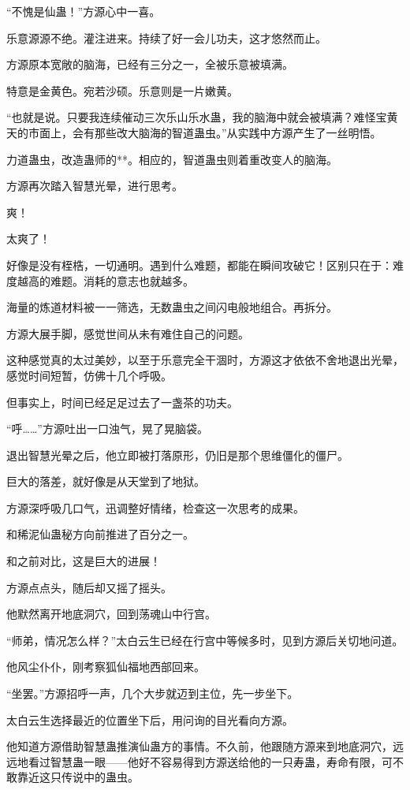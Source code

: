 \begin{this_body}
“不愧是仙蛊！”方源心中一喜。

乐意源源不绝。灌注进来。持续了好一会儿功夫，这才悠然而止。

方源原本宽敞的脑海，已经有三分之一，全被乐意被填满。

特意是金黄色。宛若沙硕。乐意则是一片嫩黄。

“也就是说。只要我连续催动三次乐山乐水蛊，我的脑海中就会被填满？难怪宝黄天的市面上，会有那些改大脑海的智道蛊虫。”从实践中方源产生了一丝明悟。

力道蛊虫，改造蛊师的**。相应的，智道蛊虫则着重改变人的脑海。

方源再次踏入智慧光晕，进行思考。

爽！

太爽了！

好像是没有桎梏，一切通明。遇到什么难题，都能在瞬间攻破它！区别只在于：难度越高的难题。消耗的意志也就越多。

海量的炼道材料被一一筛选，无数蛊虫之间闪电般地组合。再拆分。

方源大展手脚，感觉世间从未有难住自己的问题。

这种感觉真的太过美妙，以至于乐意完全干涸时，方源这才依依不舍地退出光晕，感觉时间短暂，仿佛十几个呼吸。

但事实上，时间已经足足过去了一盏茶的功夫。

“呼……”方源吐出一口浊气，晃了晃脑袋。

退出智慧光晕之后，他立即被打落原形，仍旧是那个思维僵化的僵尸。

巨大的落差，就好像是从天堂到了地狱。

方源深呼吸几口气，迅调整好情绪，检查这一次思考的成果。

和稀泥仙蛊秘方向前推进了百分之一。

和之前对比，这是巨大的进展！

方源点点头，随后却又摇了摇头。

他默然离开地底洞穴，回到荡魂山中行宫。

“师弟，情况怎么样？”太白云生已经在行宫中等候多时，见到方源后关切地问道。

他风尘仆仆，刚考察狐仙福地西部回来。

“坐罢。”方源招呼一声，几个大步就迈到主位，先一步坐下。

太白云生选择最近的位置坐下后，用问询的目光看向方源。

他知道方源借助智慧蛊推演仙蛊方的事情。不久前，他跟随方源来到地底洞穴，远远地看过智慧蛊一眼——他好不容易得到方源送给他的一只寿蛊，寿命有限，可不敢靠近这只传说中的蛊虫。


\end{this_body}
